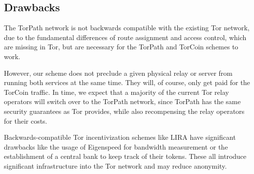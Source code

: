 \subsection{Drawbacks} The TorPath network is not backwards compatible with
the existing Tor network, due to the fundamental differences of route
assignment and access control, which are missing in Tor, but are necessary for
the TorPath and TorCoin schemes to work.

However, our scheme does not preclude a given physical relay or server from
running both services at the same time. They will, of course, only get paid
for the TorCoin traffic. In time, we expect that a majority of the current Tor
relay operators will switch over to the TorPath network, since TorPath has the
same security guarantees as Tor provides, while also recompensing the relay
operators for their costs.

Backwards-compatible Tor incentivization schemes like LIRA have significant
drawbacks like the usage of Eigenspeed for bandwidth measurement or the
establishment of a central bank to keep track of their tokens. These all
introduce significant infrastructure into the Tor network and may reduce
anonymity.
